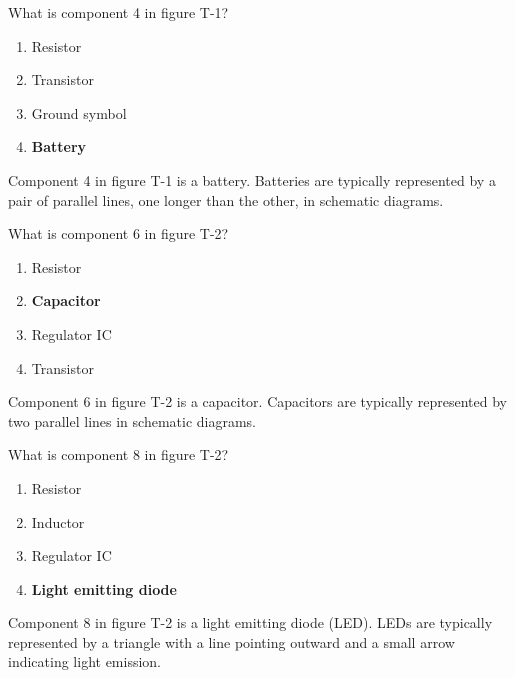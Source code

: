 \begin{tcolorbox}[colback=gray!10!white,colframe=black!75!black,title={T6C05}]
    What is component 4 in figure T-1?
    \begin{enumerate}[label=\Alph*,noitemsep]
        \item Resistor
        \item Transistor
        \item Ground symbol
        \item \textbf{Battery}
    \end{enumerate}
\end{tcolorbox}
Component 4 in figure T-1 is a battery. Batteries are typically represented by a pair of parallel lines, one longer than the other, in schematic diagrams.


\begin{tcolorbox}[colback=gray!10!white,colframe=black!75!black,title={T6C06}]
    What is component 6 in figure T-2?
    \begin{enumerate}[label=\Alph*,noitemsep]
        \item Resistor
        \item \textbf{Capacitor}
        \item Regulator IC
        \item Transistor
    \end{enumerate}
\end{tcolorbox}
Component 6 in figure T-2 is a capacitor. Capacitors are typically represented by two parallel lines in schematic diagrams.


\begin{tcolorbox}[colback=gray!10!white,colframe=black!75!black,title={T6C07}]
    What is component 8 in figure T-2?
    \begin{enumerate}[label=\Alph*,noitemsep]
        \item Resistor
        \item Inductor
        \item Regulator IC
        \item \textbf{Light emitting diode}
    \end{enumerate}
\end{tcolorbox}
Component 8 in figure T-2 is a light emitting diode (LED). LEDs are typically represented by a triangle with a line pointing outward and a small arrow indicating light emission.


